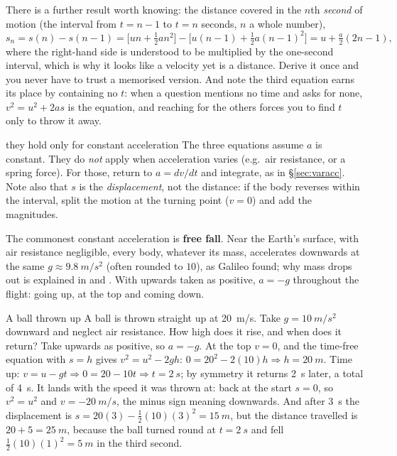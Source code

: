 There is a further result worth knowing: the distance covered in the $n$th \emph{second} of motion
(the interval from $t=n-1$ to $t=n$ seconds, $n$ a whole number),
\[
s_n=s(n)-s(n-1)=\big[un+\tfrac12an^2\big]-\big[u(n-1)+\tfrac12a(n-1)^2\big]=u+\tfrac{a}{2}(2n-1),
\]
where the right-hand side is understood to be multiplied by the one-second interval, which is why it
looks like a velocity yet is a distance. Derive it once and you never have to trust a memorised
version. And
note the third equation earns its place by containing no $t$: when a question mentions no time and asks
for none, $v^2=u^2+2as$ is the equation, and reaching for the others forces you to find $t$ only to throw
it away.


\begin{trapbox}{they hold only for constant acceleration}
The three equations assume $a$ is constant. They do \emph{not} apply when acceleration varies (e.g.\
air resistance, or a spring force). For those, return to $a=dv/dt$ and integrate, as in
\S\ref{sec:varacc}. Note also that $s$ is the \emph{displacement}, not the distance: if the body
reverses within the interval, split the motion at the turning point ($v=0$) and add the magnitudes.
\end{trapbox}

The commonest constant acceleration is \textbf{free fall}. Near the Earth's surface, with air
resistance negligible, every body, whatever its mass, accelerates downwards at the same
$g\approx\SI{9.8}{m/s^2}$ (often rounded to $10$), as Galileo found; why mass drops out is explained in
\chref{ch:newton} and \chref{ch:gravitation}. With upwards taken as positive, $a=-g$ throughout the
flight: going up, at the top and coming down.

\begin{exbox}{A ball thrown up}
A ball is thrown straight up at \SI{20}{m/s}. Take $g=\SI{10}{m/s^2}$ downward and neglect air
resistance. How high does it rise, and when does it return? Take upwards as positive, so $a=-g$. At the top $v=0$, and the time-free equation with $s=h$ gives
$v^2=u^2-2gh$: $0=20^2-2(10)h\Rightarrow h=\SI{20}{m}$.
Time up: $v=u-gt\Rightarrow0=20-10t\Rightarrow t=\SI{2}{s}$; by symmetry it returns \SI{2}{s} later, a
total of \SI{4}{s}. It lands with the speed it was thrown at: back at the start $s=0$, so
$v^2=u^2$ and $v=-\SI{20}{m/s}$, the minus sign meaning downwards. And after \SI{3}{s} the displacement is
$s=20(3)-\tfrac12(10)(3)^2=\SI{15}{m}$, but the distance travelled is $20+5=\SI{25}{m}$, because the ball turned
round at $t=\SI{2}{s}$ and fell $\tfrac12(10)(1)^2=\SI{5}{m}$ in the third second. \ans{\SI{20}{m}; \SI{4}{s}}
\end{exbox}

